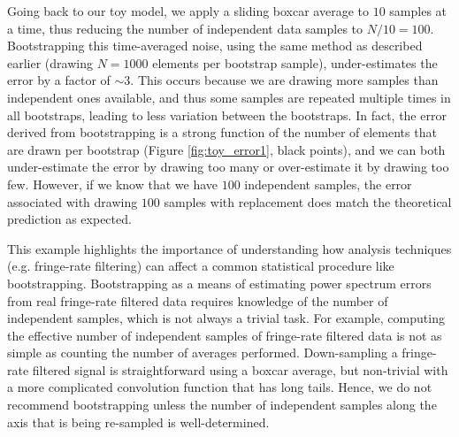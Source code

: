 \documentclass[preprint2,numberedappendix,tighten]{aastex6}  %
\begin{document}
Going back to our toy model, we apply a sliding boxcar average to $10$ samples at a time, thus reducing the number of independent data samples to $N/10 = 100$. Bootstrapping this time-averaged noise, using the same method as described earlier (drawing $N=1000$ elements per bootstrap sample), under-estimates the error by a factor of $\sim3$. This occurs because we are drawing more samples than independent ones available, and thus some samples are repeated multiple times in all bootstraps, leading to less variation between the bootstraps. In fact, the error derived from bootstrapping is a strong function of the number of elements that are drawn per bootstrap (Figure \ref{fig:toy_error1}, black points), and we can both under-estimate the error by drawing too many or over-estimate it by drawing too few. However, if we know that we have $100$ independent samples, the error associated with drawing $100$ samples with replacement does match the theoretical prediction as expected.

This example highlights the importance of understanding how analysis techniques (e.g. fringe-rate filtering) can affect a common statistical procedure like bootstrapping. Bootstrapping as a means of estimating power spectrum errors from real fringe-rate filtered data requires knowledge of the number of independent samples, which is not always a trivial task. For example, computing the effective number of independent samples of fringe-rate filtered data is not as simple as counting the number of averages performed. Down-sampling a fringe-rate filtered signal is straightforward using a boxcar average, but non-trivial with a more complicated convolution function that has long tails. Hence, we do not recommend bootstrapping unless the number of independent samples along the axis that is being re-sampled is well-determined.
\end{document}
